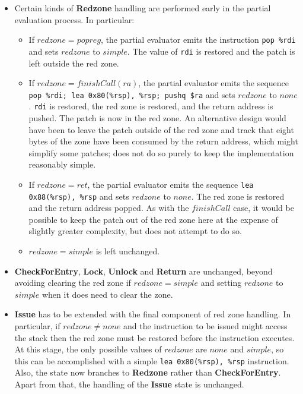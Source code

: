 \begin{itemize}
\item Certain kinds of \textbf{Redzone} handling are performed early
  in the partial evaluation process.  In particular:
  
  \begin{itemize}
  \item If $redzone = popreg$, the partial evaluator emits the
    instruction \verb|pop %rdi| and sets $redzone$ to $simple$.  The
    value of \verb|rdi| is restored and the patch is left outside the
    red zone.
  \item If $redzone = finishCall(ra)$, the partial evaluator emits the
    sequence \verb|pop %rdi; lea 0x80(%rsp), %rsp; pushq $ra| and sets
    $redzone$ to $none$.  \verb|rdi| is restored, the red zone is
    restored, and the return address is pushed.  The patch is now in
    the red zone.  An alternative design would have been to leave the
    patch outside of the red zone and track that eight bytes of the
    zone have been consumed by the return address, which might
    simplify some patches; {\implementation} does not do so purely to
    keep the implementation reasonably simple.
  \item If $redzone = ret$, the partial evaluator emits the sequence
    \verb|lea 0x88(%rsp), %rsp| and sets $redzone$ to $none$.  The red
    zone is restored and the return address popped.  As with the
    $finishCall$ case, it would be possible to keep the patch out of
    the red zone here at the expense of slightly greater complexity,
    but {\implementation} does not attempt to do so.
  \item $redzone = simple$ is left unchanged.
  \end{itemize}
\item \textbf{CheckForEntry}, \textbf{Lock}, \textbf{Unlock} and
  \textbf{Return} are unchanged, beyond avoiding clearing the red zone
  if $redzone = simple$ and setting $redzone$ to $simple$ when it does
  need to clear the zone.
\item \textbf{Issue} has to be extended with the final component of
  red zone handling.  In particular, if $redzone \not= none$ and the
  instruction to be issued might access the stack then the red zone
  must be restored before the instruction executes.  At this stage,
  the only possible values of $redzone$ are $none$ and $simple$, so
  this can be accomplished with a simple \verb|lea 0x80(%rsp), %rsp|
  instruction.  Also, the state now branches to \textbf{Redzone}
  rather than \textbf{CheckForEntry}.  Apart from that, the handling
  of the \textbf{Issue} state is unchanged.
\end{itemize}

